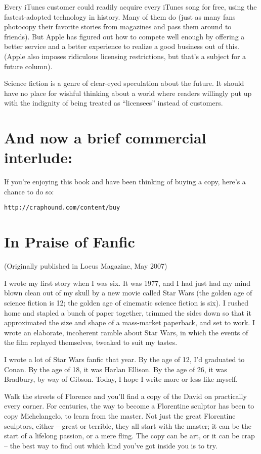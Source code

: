 Every iTunes customer could readily acquire every iTunes song for
free, using the fastest-adopted technology in history. Many of them
do (just as many fans photocopy their favorite stories from
magazines and pass them around to friends). But Apple has figured
out how to compete well enough by offering a better service and a
better experience to realize a good business out of this. (Apple
also imposes ridiculous licensing restrictions, but that's a
subject for a future column).

Science fiction is a genre of clear-eyed speculation about the
future. It should have no place for wishful thinking about a world
where readers willingly put up with the indignity of being treated
as ``licensees'' instead of customers.

\section{And now a brief commercial interlude:}

If you're enjoying this book and have been thinking of buying a
copy, here's a chance to do so:

\texttt{http://craphound.com/content/buy}

\section{In Praise of Fanfic}

(Originally published in Locus Magazine, May 2007)

I wrote my first story when I was six. It was 1977, and I had just
had my mind blown clean out of my skull by a new movie called Star
Wars (the golden age of science fiction is 12; the golden age of
cinematic science fiction is six). I rushed home and stapled a
bunch of paper together, trimmed the sides down so that it
approximated the size and shape of a mass-market paperback, and set
to work. I wrote an elaborate, incoherent ramble about Star Wars,
in which the events of the film replayed themselves, tweaked to
suit my tastes.

I wrote a lot of Star Wars fanfic that year. By the age of 12, I'd
graduated to Conan. By the age of 18, it was Harlan Ellison. By the
age of 26, it was Bradbury, by way of Gibson. Today, I hope I write
more or less like myself.

Walk the streets of Florence and you'll find a copy of the David on
practically every corner. For centuries, the way to become a
Florentine sculptor has been to copy Michelangelo, to learn from
the master. Not just the great Florentine sculptors, either --
great or terrible, they all start with the master; it can be the
start of a lifelong passion, or a mere fling. The copy can be art,
or it can be crap -- the best way to find out which kind you've got
inside you is to try.

